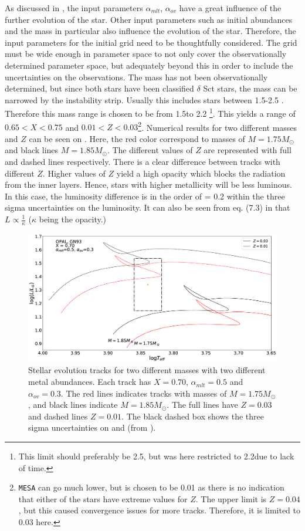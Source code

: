 As discussed in , the input parameters $\alpha_{mlt}$, $\alpha_{ov}$ have a great influence of the further evolution of the star. Other input parameters such as initial abundances and the mass in particular also influence the evolution of the star. Therefore, the input parameters for the initial grid need to be thoughtfully considered.  The grid must be wide enough in parameter space to not only cover the observationally determined parameter space, but adequately beyond this in order to include the uncertainties on the observations.
The mass has not been observationally determined, but since both stars have been classified $\delta$ Sct stars, the mass can be narrowed by the instability strip. Usually this includes stars between 1.5-2.5 \msun. Therefore this mass range is chosen to be from 1.5\msun to 2.2 \msun\footnote{This limit should preferably be 2.5\msun, but was here restricted to 2.2\msun due to lack of time.}. This yields a range of $0.65<X<0.75$ and $0.01<Z<0.03$\footnote{\texttt{MESA} can go much lower, but is chosen to be 0.01 as there is no indication that either of the stars have extreme values for $Z$. The upper limit is $Z= 0.04$, but this caused convergence issues for more tracks. Therefore, it is limited to 0.03 here.}. Numerical results for two different masses and $Z$ can be seen on . Here, the red color correspond to masses of $M=1.75M_\odot$ and black lines $M=1.85M_\odot$. The different values of $Z$ are represented with full and dashed lines respectively. There is a clear difference between tracks with different $Z$. Higher values of $Z$ yield a high opacity which blocks the radiation from the inner layers. Hence, stars with higher metallicity will be less luminous. In this case, the luminosity difference is in the order of \lum = 0.2 within the three sigma uncertainties on the luminosity.  It can also be seen from eq. (7.3) in \citet{christensen2008lecture} that $L \propto \frac{1}{\kappa}$ ($\kappa$ being the opacity.)


\begin{figure}[htbp]
	\centering
	\includegraphics[width=1\textwidth]{test_z.eps}
	\caption{Stellar evolution tracks for two different masses with two different metal abundances. Each track has $X=0.70$, $\alpha_{mlt}=0.5$ and $\alpha_{ov}=0.3$. The red lines indicates tracks with masses of $M=1.75M_\odot$, and black lines indicate $M=1.85M_\odot$. The full lines have $Z = 0.03$ and dashed lines $Z = 0.01$. The black dashed box shows the three sigma uncertainties on \lum and \teff (from \citet{lenz2010delta}). }
	\label{diffz}
\end{figure}

